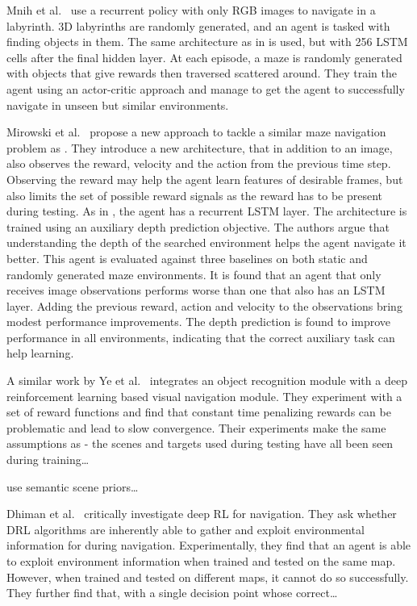 Mnih et al.~\cite{mnih_asynchronous_2016} use a recurrent policy with only RGB images to navigate in a labyrinth.
3D labyrinths are randomly generated, and an agent is tasked with finding objects in them.
The same architecture as in \cite{mnih_human_2015} is used, but with 256 LSTM cells after the final hidden layer.
At each episode, a maze is randomly generated with objects that give rewards then traversed scattered around.
They train the agent using an actor-critic approach and manage to get the agent to successfully navigate in unseen but similar environments.

Mirowski et al.~\cite{mirowski_navigate_2017} propose a new approach to tackle a similar maze navigation problem as \cite{mnih_asynchronous_2016}.
They introduce a new architecture, that in addition to an image, also observes the reward, velocity and the action from the previous time step.
Observing the reward may help the agent learn features of desirable frames, but also limits the set of possible reward signals as the reward has to be present during testing.
As in \cite{mnih_asynchronous_2016}, the agent has a recurrent LSTM layer. 
The architecture is trained using an auxiliary depth prediction objective.
The authors argue that understanding the depth of the searched environment helps the agent navigate it better.
This agent is evaluated against three baselines on both static and randomly generated maze environments.
It is found that an agent that only receives image observations performs worse than one that also has an LSTM layer.
Adding the previous reward, action and velocity to the observations bring modest performance improvements.
The depth prediction is found to improve performance in all environments, indicating that the correct auxiliary task can help learning.

A similar work by Ye et al.~\cite{ye_active_2018} integrates an object recognition module with a deep reinforcement learning based visual navigation module.
They experiment with a set of reward functions and find that constant time penalizing rewards can be problematic and lead to slow convergence.
Their experiments make the same assumptions as \cite{zhu_target_2016} - the scenes and targets used during testing have all been seen during training\dots

\cite{yang_semantic_2018} use semantic scene priors\dots


Dhiman et al.~\cite{dhiman_critical_2019} critically investigate deep RL for navigation.
They ask whether DRL algorithms are inherently able to gather and exploit environmental information for during navigation.
Experimentally, they find that an agent is able to exploit environment information when trained and tested on the same map.
However, when trained and tested on different maps, it cannot do so successfully.
They further find that, with a single decision point whose correct\dots

